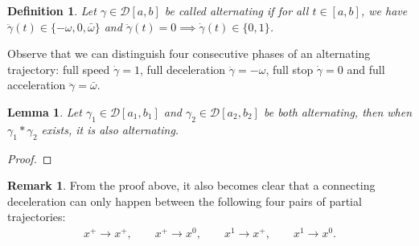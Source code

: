 \documentclass[a4paper]{article}
\theoremstyle{definition}
\newtheorem{remark}{Remark}
\theoremstyle{plain}
\newtheorem{define}{Definition\hspace{0.25em}\ignorespaces}
\newtheorem{lemma}{Lemma\hspace{0.25em}\ignorespaces}
\begin{document}
\begin{define}
  Let $\gamma \in \mathcal{D}[a, b]$ be called \emph{alternating} if for all $t \in [a, b]$,
  we have $\ddot{\gamma}(t) \in \{-\omega, 0, \bar{\omega}\}$ and
  $\ddot{\gamma}(t) = 0 \implies \dot{\gamma}(t) \in \{0, 1\}$.
\end{define}

Observe that we can distinguish four consecutive phases of an alternating
trajectory: full speed $\dot{\gamma} = 1$, full deceleration
$\ddot{\gamma} = -\omega$, full stop $\dot{\gamma} = 0$ and full acceleration
$\ddot{\gamma} = \bar{\omega}$.

\begin{lemma}
  Let $\gamma_{1} \in \mathcal{D}[a_{1}, b_{1}]$ and $\gamma_{2} \in \mathcal{D}[a_{2}, b_{2}]$ be both alternating, then when $\gamma_{1} * \gamma_{2}$ exists, it is also alternating.
\end{lemma}
\begin{proof}

\end{proof}

\begin{remark}
  From the proof above, it also becomes clear that a connecting deceleration can only happen between the following four pairs of partial trajectories:
  \begin{align*}
     x^{+} \rightarrow x^{+} , \quad \quad
     x^{+} \rightarrow x^{0} , \quad \quad
     x^{1} \rightarrow x^{+} , \quad \quad
     x^{1} \rightarrow x^{0} .
  \end{align*}
\end{remark}
\end{document}
